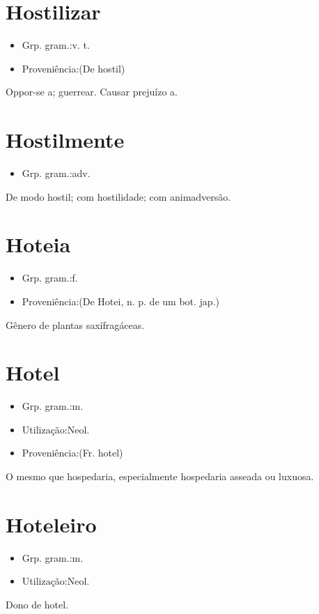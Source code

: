 \documentclass{article}
\begin{document}
\section{Hostilizar}
\begin{itemize}
\item {Grp. gram.:v. t.}
\end{itemize}
\begin{itemize}
\item {Proveniência:(De \textunderscore hostil\textunderscore )}
\end{itemize}
Oppor-se a; guerrear.
Causar prejuízo a.
\section{Hostilmente}
\begin{itemize}
\item {Grp. gram.:adv.}
\end{itemize}
De modo hostil; com hostilidade; com animadversão.
\section{Hoteia}
\begin{itemize}
\item {Grp. gram.:f.}
\end{itemize}
\begin{itemize}
\item {Proveniência:(De \textunderscore Hotei\textunderscore , n. p. de um bot. jap.)}
\end{itemize}
Gênero de plantas saxífragáceas.
\section{Hotel}
\begin{itemize}
\item {Grp. gram.:m.}
\end{itemize}
\begin{itemize}
\item {Utilização:Neol.}
\end{itemize}
\begin{itemize}
\item {Proveniência:(Fr. \textunderscore hotel\textunderscore )}
\end{itemize}
O mesmo que \textunderscore hospedaria\textunderscore , especialmente hospedaria asseada ou luxuosa.
\section{Hoteleiro}
\begin{itemize}
\item {Grp. gram.:m.}
\end{itemize}
\begin{itemize}
\item {Utilização:Neol.}
\end{itemize}
Dono de hotel.
\end{document}
